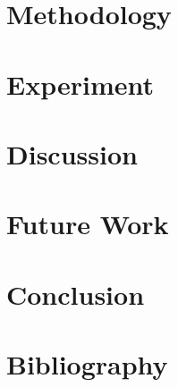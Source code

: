 \documentclass[
]{uob-thesis}
\begin{document}
  

\chapter{Methodology}

  

\chapter{Experiment}

  

\chapter{Discussion}

  

\chapter{Future Work}

  

\chapter{Conclusion}

  



\backmatter

\chapter*{Bibliography}

\printbibliography[heading=none]
\end{document}
